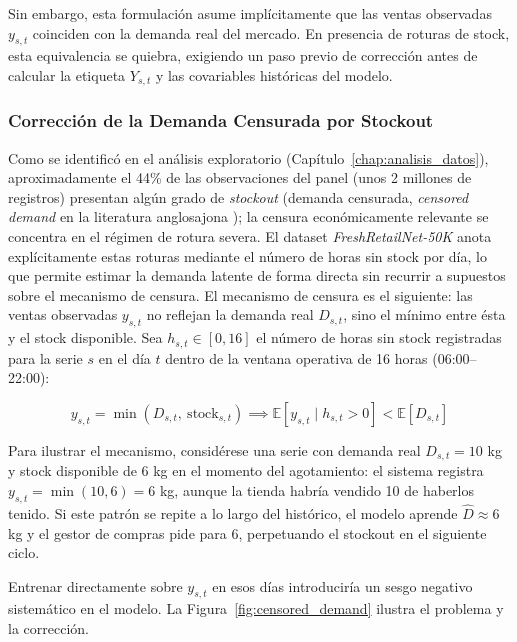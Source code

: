 Sin embargo, esta formulación asume implícitamente que las ventas observadas $y_{s,t}$ coinciden con la demanda real del mercado. En presencia de roturas de stock, esta equivalencia se quiebra, exigiendo un paso previo de corrección antes de calcular la etiqueta $Y_{s,t}$ y las covariables históricas del modelo.

\subsubsection{Corrección de la Demanda Censurada por Stockout}
\label{sec:demanda_censurada}
Como se identificó en el análisis exploratorio (Capítulo~\ref{chap:analisis_datos}), aproximadamente el 44\% de las observaciones del panel (unos 2 millones de registros) presentan algún grado de \textit{stockout} (demanda censurada, \textit{censored demand} en la literatura anglosajona \cite{nahmias1994demand}); la censura económicamente relevante se concentra en el régimen de rotura severa. El dataset \textit{FreshRetailNet-50K} \cite{freshretailnet2025} anota explícitamente estas roturas mediante el número de horas sin stock por día, lo que permite estimar la demanda latente de forma directa sin recurrir a supuestos sobre el mecanismo de censura. El mecanismo de censura es el siguiente: las ventas observadas $y_{s,t}$ no reflejan la demanda real $D_{s,t}$, sino el mínimo entre ésta y el stock disponible. Sea $h_{s,t} \in [0, 16]$ el número de horas sin stock registradas para la serie $s$ en el día $t$ dentro de la ventana operativa de 16 horas (06:00--22:00):

\begin{equation}
    y_{s,t} = \min\!\left(D_{s,t},\ \text{stock}_{s,t}\right)
    \implies \mathbb{E}[y_{s,t} \mid h_{s,t}>0] < \mathbb{E}[D_{s,t}]
\end{equation}

Para ilustrar el mecanismo, considérese una serie con demanda real $D_{s,t} = 10$ kg y stock disponible de 6 kg en el momento del agotamiento: el sistema registra $y_{s,t} = \min(10, 6) = 6$ kg, aunque la tienda habría vendido 10 de haberlos tenido. Si este patrón se repite a lo largo del histórico, el modelo aprende $\hat{D} \approx 6$ kg y el gestor de compras pide para 6, perpetuando el stockout en el siguiente ciclo.

Entrenar directamente sobre $y_{s,t}$ en esos días introduciría un sesgo negativo sistemático en el modelo. La Figura~\ref{fig:censored_demand} ilustra el problema y la corrección.

